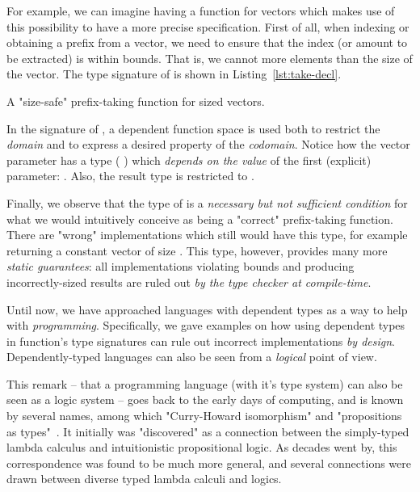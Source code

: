             For example, we can imagine having a  function for vectors which makes use
            of this possibility to have a more precise specification.
            First of all, when indexing or obtaining a prefix from a vector,
            we need to ensure that the index (or amount to be extracted) is within bounds.
            That is, we cannot  more elements than the size of the vector.
            The type signature of  is shown in Listing~\ref{lst:take-decl}.

            \begin{listing}[h]
                \caption{A "size-safe" prefix-taking function for sized vectors. \label{lst:take-decl}}
            \end{listing}

            In the signature of , a dependent function space is used both
            to restrict the \emph{domain} and to express a desired property of the \emph{codomain}.
            Notice how the vector parameter has a type (  \AY{(} \AF{+} \AY{)})
            which \emph{depends on the value} of the first (explicit) parameter: .
            Also, the result type is restricted to   .

            Finally, we observe that the type of  is a \emph{necessary but not sufficient condition}
            for what we would intuitively conceive as being a "correct" prefix-taking function.
            There are "wrong" implementations which still would have this type, for example
            returning a constant vector of size .
            This type, however, provides many more \emph{static guarantees}:
            all implementations violating bounds and producing incorrectly-sized results
            are ruled out \emph{by the type checker at compile-time}.

            Until now, we have approached languages with dependent types as a way to help with \emph{programming}.
            Specifically, we gave examples on how using dependent types in function's type signatures
            can rule out incorrect implementations \emph{by design}.
            Dependently-typed languages can also be seen from a \emph{logical} point of view.

            This remark – that a programming language (with it's type system) can also be seen
            as a logic system – goes back to the early days of computing, and is known by several names,
            among which "Curry-Howard isomorphism" and "propositions as types"~\cite{propositions-as-types}.
            It initially was "discovered" as a connection between the simply-typed lambda calculus
            and intuitionistic propositional logic.
            As decades went by, this correspondence was found to be much more general,
            and several connections were drawn between diverse typed lambda calculi and logics.

